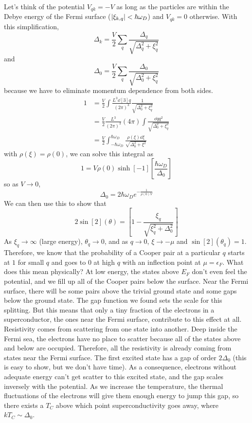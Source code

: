 \documentclass[a4paper,twoside,master.tex]{subfiles}
\begin{document}
Let's think of the potential $ V_{qk} = - V $ as long as the particles are within the Debye energy of the Fermi surface ($ \abs{\xi_{k,q}} < \hbar \omega_D $) and $ V_{qk} = 0 $ otherwise. With this simplification,
\begin{equation}
    \Delta_k = \frac{V}{2} \sum_q \frac{\Delta_q}{\sqrt{\Delta_q^2 + \xi_q^2}}
\end{equation}
and
\begin{equation}
    \Delta_0 = \frac{V}{2} \sum_q \frac{\Delta_0}{\sqrt{\Delta_0^2 + \xi_q^2}}
\end{equation}
because we have to eliminate momentum dependence from both sides.
\begin{align}
    1 &= \frac{V}{2} \int \frac{L^3 \dd[3]{q}}{(2 \pi)^3} \frac{1}{\sqrt{\Delta_0^2 + \xi_q^2}} \\
    &= \frac{V}{2} \frac{L^3}{(2 \pi)^3} (4 \pi) \int \frac{\dd{q} q^2}{\sqrt{\Delta_0^2 + \xi_q^2}} \\
    &= \frac{V}{2} \int_{- \hbar \omega_D}^{\hbar \omega_D} \frac{\rho(\xi) \dd{\xi}}{\sqrt{\Delta_0^2 + \xi^2}}
\end{align}
with $ \rho(\xi) = \rho(0) $, we can solve this integral as
\begin{equation}
    1 = V \rho(0) \sinh[-1]\left[ \frac{\hbar \omega_D}{\Delta_0}  \right]
\end{equation}
so as $ V \to 0 $,
\begin{equation}
    \Delta_0 = 2 \hbar \omega_D e^{- \frac{1}{\rho(0) V}}
\end{equation}
We can then use this to show that
\begin{equation}
    2 \sin[2](\theta) = \left[ 1 - \frac{\xi_q}{\sqrt{\xi_q^2 + \Delta_0^2}} \right]
\end{equation}
As $ \xi_q \to \infty $ (large energy), $ \theta_q \to 0 $, and as $ q \to 0 $, $ \xi \to - \mu $ and $ \sin[2](\theta_q) = 1 $. Therefore, we know that the probability of a Cooper pair at a particular $ q $ starts at $ 1 $ for small $ q $ and goes to $ 0 $ at high $ q $ with an inflection point at $ \mu = \epsilon_F $. What does this mean physically? At low energy, the states above $ E_F $ don't even feel the potential, and we fill up all of the Cooper pairs below the surface. Near the Fermi surface, there will be some pairs above the trivial ground state and some gaps below the ground state. The gap function we found sets the scale for this splitting. But this means that only a tiny fraction of the electrons in a superconductor, the ones near the Fermi surface, contribute to this effect at all. Resistivity comes from scattering from one state into another. Deep inside the Fermi sea, the electrons have no place to scatter because all of the states above and below are occupied. Therefore, all the resistivity is already coming from states near the Fermi surface. The first excited state has a gap of order $ 2 \Delta_0 $ (this is easy to show, but we don't have time). As a consequence, electrons without adequate energy can't get scatter to this excited state, and the gap scales inversely with the potential. As we increase the temperature, the thermal fluctuations of the electrons will give them enough energy to jump this gap, so there exists a $ T_C $ above which point superconductivity goes away, where $ k T_C \sim \Delta_0 $.
\end{document}
